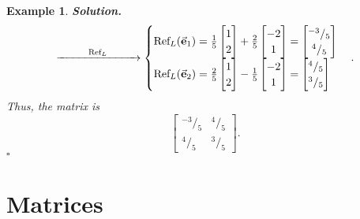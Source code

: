\documentclass[12pt, a4paper]{article}
\newtheorem{eg}{Example}[subsection]
\newenvironment*{sol}{\par\indent\textbf{\textit{Solution. }}}{\hfill{$\square$}\par}
\def\vece{\va{e}}
\begin{document}
\begin{eg}
\begin{sol}
$$\xrightarrow{\ \ \ \ \ \ \ \ \text{Ref}_L\ \ \ \ \ \ \ \ }\begin{cases}\text{Ref}_L(\vece_1)=\frac{1}{5}\begin{bmatrix}1\\2\end{bmatrix}+\frac{2}{5}\begin{bmatrix}-2\\1\end{bmatrix}=\begin{bmatrix}^{-3}/_5\\^4/_5\end{bmatrix}\\\text{Ref}_L(\vece_2)=\frac{2}{5}\begin{bmatrix}1\\2\end{bmatrix}-\frac{1}{5}\begin{bmatrix}-2\\1\end{bmatrix}=\begin{bmatrix}^4/_5\\^3/_5\end{bmatrix}\end{cases}.$$
Thus, the matrix is 
$$\left[\begin{array}{cc}^{-3}/_{5}&^4/_{5}\\ ^{4}/_{5}&^{3}/_{5}\end{array}\right].$$
\end{sol}
\end{eg}

\newpage
\section{Matrices}
\end{document}
